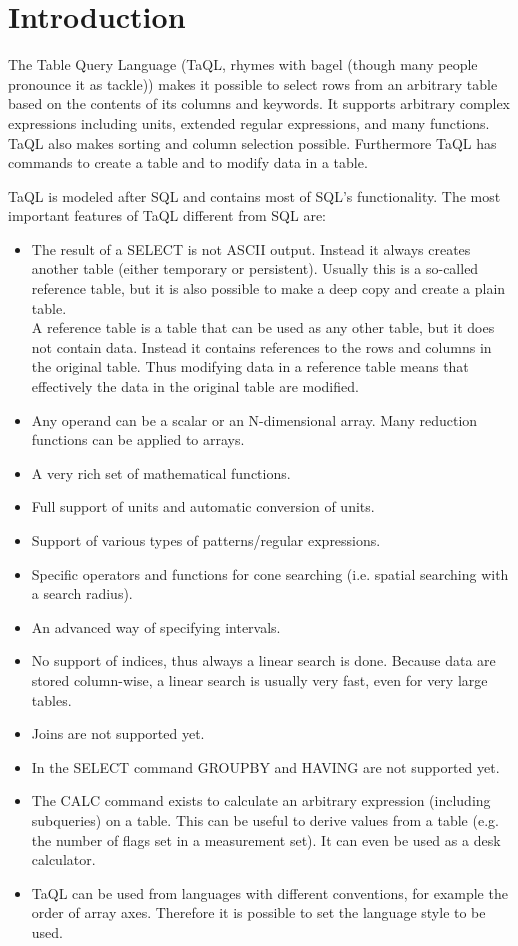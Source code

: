 

\section{Introduction}
The Table Query Language (TaQL, rhymes with bagel (though many people
pronounce it as tackle)) makes it possible to select
rows from an arbitrary table based on the contents of its
columns and keywords. It supports arbitrary complex
expressions including units, extended regular expressions, and many functions.
TaQL also makes sorting and column selection possible.
Furthermore TaQL has commands to create a table and to modify data
in a table.

TaQL is modeled after SQL and contains most of SQL's functionality.
The most important features of TaQL different from SQL are:
\begin{itemize}
\item The result of a SELECT is not ASCII output. Instead it always
creates another table (either temporary or persistent). Usually this
is a so-called reference table, but it is also possible to make a deep
copy and create a plain table.
\\A reference table is a table that can be used as any other table,
but it does not contain data. Instead it contains references to the
rows and columns in the original table. Thus modifying data in a
reference table means that effectively the data in the original
table are modified.
\item Any operand can be a scalar or an N-dimensional array.
Many reduction functions can be applied to arrays.
\item A very rich set of mathematical functions.
\item Full support of units and automatic conversion of units.
\item Support of various types of patterns/regular expressions.
\item Specific operators and functions for cone searching
(i.e. spatial searching with a search radius).
\item An advanced way of specifying intervals.
\item No support of indices, thus always a linear search is done.
Because data are stored column-wise, a linear search is usually very
 fast, even for very large tables.
\item Joins are not supported yet.
\item In the SELECT command GROUPBY and HAVING are not supported yet.
\item The CALC command exists to
calculate an arbitrary expression (including subqueries) on a
table. This can be useful to derive values from a table (e.g. the
number of flags set in a measurement set). It can even be used as a
desk calculator.
\item TaQL can be used from languages with different conventions, for
example the order of array axes. Therefore it is possible to set the
language style to be used.
\end{itemize}

